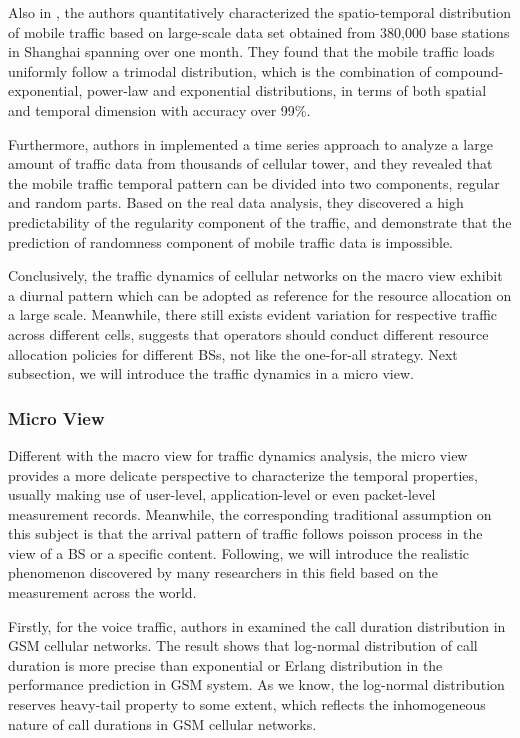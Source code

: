 {Also in \cite{wang2015characterizing}, the authors quantitatively characterized the spatio-temporal distribution of mobile traffic based on large-scale data set obtained from 380,000 base stations in Shanghai spanning over one month. They found that the mobile traffic loads uniformly follow a trimodal distribution, which is the combination of compound-exponential, power-law and exponential distributions, in terms of both spatial and temporal dimension with accuracy over 99\%.

Furthermore, authors in \cite{xu2016big} implemented a time series approach to analyze a large amount of traffic data from thousands of cellular tower, and they revealed that the mobile traffic temporal pattern can be divided into two components, regular and random parts. Based on the real data analysis, they discovered a high predictability of the regularity component of the traffic, and demonstrate that the prediction of randomness component of mobile traffic data is impossible.

Conclusively, the traffic dynamics of cellular networks on the macro view exhibit a diurnal pattern which can be adopted as reference for the resource allocation on a large scale. Meanwhile, there still exists evident variation for respective traffic across different cells, suggests that operators should conduct different resource allocation policies for different BSs, not like the one-for-all strategy. Next subsection, we will introduce the traffic dynamics in a micro view.

\subsubsection{Micro View}
Different with the macro view for traffic dynamics analysis, the micro view provides a more delicate perspective to characterize the temporal properties, usually making use of user-level, application-level or even packet-level measurement records. Meanwhile, the corresponding traditional assumption on this subject is that the arrival pattern of traffic follows poisson process in the view of a BS or a specific content. Following, we will introduce the realistic phenomenon discovered by many researchers in this field based on the measurement across the world.   

Firstly, for the voice traffic, authors in \cite{guo2007estimate} examined the call duration distribution in GSM cellular networks. The result shows that log-normal distribution of call duration is more precise than exponential or Erlang distribution in the performance prediction in GSM system. As we know, the log-normal distribution reserves heavy-tail property to some extent, which reflects the inhomogeneous nature of call durations in GSM cellular networks.

}
